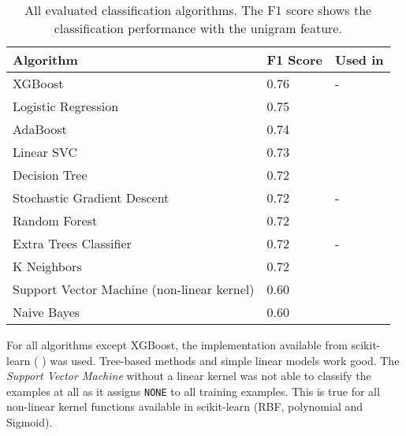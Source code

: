 \begin{table}[h]
\centering
\label{tbl:algo}
\caption{All evaluated classification algorithms. The F1 score shows the classification performance with the unigram feature.}
\begin{tabularx}{\textwidth}{XlX}
\toprule
Algorithm & F1 Score & Used in\\ \midrule

XGBoost & 0.76 & -\\ 

Logistic Regression & 0.75 &  \cite{Dusmanu2017Argument-Mining,Daxenberger2017What-is-the-EssAker2017What-works-and-,Lippi2016Argumentation-M}\\ 

AdaBoost & 0.74 &  \cite{Aker2017What-works-and-}\\  

Linear SVC & 0.73 & \cite{Aker2017What-works-and-}\\  

Decision Tree & 0.72 &  \cite{Stab2014Identifying-Arg,Lippi2016Argumentation-M}\\ 

Stochastic Gradient Descent & 0.72 & -\\ 


Random Forest & 0.72 &  \cite{Dusmanu2017Argument-Mining,Stab2014Identifying-Arg,Eckle-Kohler2015On-the-Role-of-,Aker2017What-works-and-,Lippi2016Argumentation-M}\\  

Extra Trees Classifier & 0.72 & - \\

K Neighbors & 0.72 &  \cite{Aker2017What-works-and-}\\ 


Support Vector Machine (non-linear kernel) & 0.60 & \cite{Stab2014Identifying-Arg,Eckle-Kohler2015On-the-Role-of-,Park:2012:ICC:2391171.2391173,Lippi2016Argumentation-M,Habernal2016Argumentation-M}\\ 


Naive Bayes & 0.60 & \cite{Stab2014Identifying-Arg,Eckle-Kohler2015On-the-Role-of-,Aker2017What-works-and-,Park:2012:ICC:2391171.2391173,Lippi2016Argumentation-M}\\  


 \bottomrule 
\end{tabularx}

\end{table}


For all algorithms except XGBoost, the implementation available from scikit-learn (\cite{scikit-learn} ) was used. Tree-based methods and simple linear models work good. The \emph{Support Vector Machine} without a linear kernel was not able to classify the examples at all as it assigns \texttt{NONE} to all training examples. This is true for all non-linear kernel functions available in scikit-learn (RBF, polynomial and Sigmoid).

